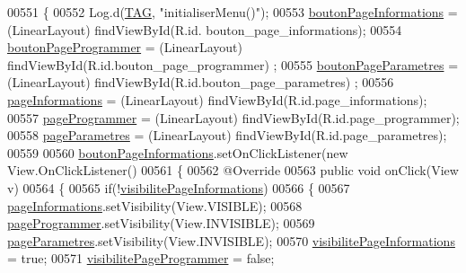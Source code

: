 \begin{DoxyCode}
00551     \{
00552         Log.d(\hyperlink{classcom_1_1example_1_1ekawa_1_1_ihm_a95cd92c2acaf9f8982302da08d94f9aa}{TAG}, \textcolor{stringliteral}{"initialiserMenu()"});
00553         \hyperlink{classcom_1_1example_1_1ekawa_1_1_ihm_a93dd279f2c6fa8d4e22ce298b1c4ab16}{boutonPageInformations} = (LinearLayout) findViewById(R.id.
      bouton\_page\_informations);
00554         \hyperlink{classcom_1_1example_1_1ekawa_1_1_ihm_a15ad5787c0800a7a2e2f00964787255f}{boutonPageProgrammer} = (LinearLayout) findViewById(R.id.bouton\_page\_programmer)
      ;
00555         \hyperlink{classcom_1_1example_1_1ekawa_1_1_ihm_a11fe63d247e6b4966aac0086c06bd495}{boutonPageParametres} = (LinearLayout) findViewById(R.id.bouton\_page\_parametres)
      ;
00556         \hyperlink{classcom_1_1example_1_1ekawa_1_1_ihm_a554ab8cbe600e837516ec78e62312fea}{pageInformations} = (LinearLayout) findViewById(R.id.page\_informations);
00557         \hyperlink{classcom_1_1example_1_1ekawa_1_1_ihm_a9a3747e82c5917a681a8d8a726cd5fa8}{pageProgrammer} = (LinearLayout) findViewById(R.id.page\_programmer);
00558         \hyperlink{classcom_1_1example_1_1ekawa_1_1_ihm_a12537211f4d695c3dc62713da00ffa35}{pageParametres} = (LinearLayout) findViewById(R.id.page\_parametres);
00559 
00560         \hyperlink{classcom_1_1example_1_1ekawa_1_1_ihm_a93dd279f2c6fa8d4e22ce298b1c4ab16}{boutonPageInformations}.setOnClickListener(\textcolor{keyword}{new} View.OnClickListener()
00561         \{
00562             @Override
00563             \textcolor{keyword}{public} \textcolor{keywordtype}{void} onClick(View v)
00564             \{
00565                 \textcolor{keywordflow}{if}(!\hyperlink{classcom_1_1example_1_1ekawa_1_1_ihm_a3a1aee8b3e12447c5a73aa16de64b1f0}{visibilitePageInformations})
00566                 \{
00567                     \hyperlink{classcom_1_1example_1_1ekawa_1_1_ihm_a554ab8cbe600e837516ec78e62312fea}{pageInformations}.setVisibility(View.VISIBLE);
00568                     \hyperlink{classcom_1_1example_1_1ekawa_1_1_ihm_a9a3747e82c5917a681a8d8a726cd5fa8}{pageProgrammer}.setVisibility(View.INVISIBLE);
00569                     \hyperlink{classcom_1_1example_1_1ekawa_1_1_ihm_a12537211f4d695c3dc62713da00ffa35}{pageParametres}.setVisibility(View.INVISIBLE);
00570                     \hyperlink{classcom_1_1example_1_1ekawa_1_1_ihm_a3a1aee8b3e12447c5a73aa16de64b1f0}{visibilitePageInformations} = \textcolor{keyword}{true};
00571                     \hyperlink{classcom_1_1example_1_1ekawa_1_1_ihm_a1db719bfa9b48f6c1f64259e37703963}{visibilitePageProgrammer} = \textcolor{keyword}{false};

\end{DoxyCode}
